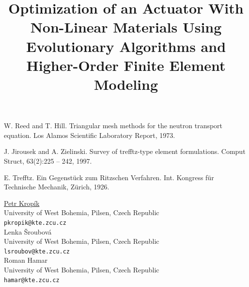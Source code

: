 \documentclass[article, A4, 11pt]{llncs}%
\begin{document}

\begin{thebibliography}{10}
{\sc W. Reed and T. Hill}. {Triangular mesh methods for the neutron transport equation}. Los Alamos Scientific Laboratory Report, 1973.

{\sc J. Jirousek and A. Zielinski}. {Survey of trefftz-type element formulations}. Comput Struct, 63(2):225 -- 242, 1997.

{\sc E. Trefftz}. {Ein Gegenst\"uck zum Ritzschen Verfahren}. Int. Kongress f\"ur Technische Mechanik, Z\"urich, 1926.
\end{thebibliography} %

\title{Optimization of an Actuator With Non-Linear Materials Using Evolutionary Algorithms and Higher-Order Finite Element Modeling}
 \author{} \institute{}
\maketitle
\begin{center}
{\large \underline{Petr Krop\'{i}k}}\\
University of West Bohemia, Pilsen, Czech Republic\\
{\tt pkropik@kte.zcu.cz}
\\ \vspace{4mm}
{\large Lenka \v{S}roubov\'{a}}\\
University of West Bohemia, Pilsen, Czech Republic\\
{\tt lsroubov@kte.zcu.cz}
\\ \vspace{4mm}
{\large Roman Hamar}\\
University of West Bohemia, Pilsen, Czech Republic\\
{\tt hamar@kte.zcu.cz}
\end{center}
\end{document}
